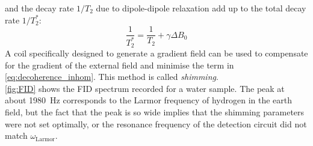 \documentclass[
    parskip=half, 
    twoside=false,
    twocolumn=true,
    fontsize=11pt,
]{scrarticle}
\begin{document}
and the decay rate $1/T_2$ due to dipole-dipole relaxation add up to the total decay rate $1/T_2^*$:
\begin{equation}
 \frac{1}{T_2^*} = \frac{1}{T_2} + \gamma \Delta B_0
\end{equation}
A coil specifically designed to generate a gradient field can be used to compensate for the gradient of the external field and minimise the term in \autoref{eq:decoherence_inhom}. This method is called \textit{shimming}.\\
\autoref{fig:FID} shows the FID spectrum recorded for a water sample. The peak at about \SI{1980}{\hertz} corresponds to the Larmor frequency of hydrogen in the earth field, but the fact that the peak is so wide implies that the shimming parameters were not set optimally, or the resonance frequency of the detection circuit did not match $\omega_\text{Larmor}$.
\end{document}
